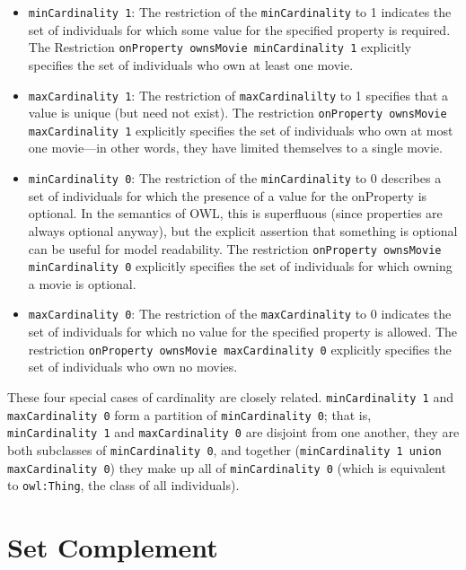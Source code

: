 \begin{itemize}
\item \texttt{minCardinality 1}: The restriction of the \texttt{minCardinality} to 1 indicates
the set of individuals for which some value for the specified property
is required. The Restriction \texttt{onProperty ownsMovie minCardinality 1}
explicitly specifies the set of individuals who own at least one movie.

\item \texttt{maxCardinality 1}: The restriction of \texttt{maxCardinalilty} to 1 specifies that
a value is unique (but need not exist). The restriction \texttt{onProperty
ownsMovie maxCardinality 1} explicitly specifies the set of individuals
who own at most one movie---in other words, they have limited themselves
to a single movie.

\item \texttt{minCardinality 0}: The restriction of the \texttt{minCardinality} to 0 describes a
set of individuals for which the presence of a value for the onProperty
is optional. In the semantics of OWL, this is superfluous (since
properties are always optional anyway), but the explicit assertion that
something is optional can be useful for model readability. The
restriction \texttt{onProperty ownsMovie minCardinality 0} explicitly specifies
the set of individuals for which owning a movie is optional.

\item \texttt{maxCardinality 0}: The restriction of the \texttt{maxCardinality} to 0 indicates
the set of individuals for which no value for the specified property is
allowed. The restriction \texttt{onProperty ownsMovie maxCardinality 0}
explicitly specifies the set of individuals who own no movies.
\end{itemize}


These four special cases of cardinality are closely related.
\texttt{minCardinality 1} and \texttt{maxCardinality 0} form a partition of \texttt{minCardinality
0}; that is, \texttt{minCardinality 1} and \texttt{maxCardinality 0} are disjoint from one
another, they are both subclasses of \texttt{minCardinality 0}, and together
(\texttt{minCardinality 1 union maxCardinality 0}) they make up all of
\texttt{minCardinality 0} (which is equivalent to \texttt{owl:Thing}, the class of all
individuals).

\section{Set Complement}

